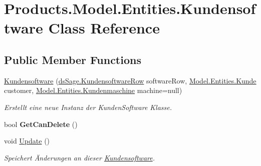 \hypertarget{class_products_1_1_model_1_1_entities_1_1_kundensoftware}{}\section{Products.\+Model.\+Entities.\+Kundensoftware Class Reference}
\label{class_products_1_1_model_1_1_entities_1_1_kundensoftware}
\subsection*{Public Member Functions}
\begin{DoxyCompactItemize}
\item 
\hyperlink{class_products_1_1_model_1_1_entities_1_1_kundensoftware_ab1a7f611574369c4fd3ec7b47744e530}{Kundensoftware} (\hyperlink{class_products_1_1_data_1_1ds_sage_1_1_kundensoftware_row}{ds\+Sage.\+Kundensoftware\+Row} software\+Row, \hyperlink{class_products_1_1_model_1_1_entities_1_1_kunde}{Model.\+Entities.\+Kunde} customer, \hyperlink{class_products_1_1_model_1_1_entities_1_1_kundenmaschine}{Model.\+Entities.\+Kundenmaschine} machine=null)
\begin{DoxyCompactList}\small\item\em Erstellt eine neue Instanz der Kunden\+Software Klasse. \end{DoxyCompactList}\item 
bool {\bfseries Get\+Can\+Delete} ()\hypertarget{class_products_1_1_model_1_1_entities_1_1_kundensoftware_a297dd386662d6cf12e5f022dbbd592f2}{}\label{class_products_1_1_model_1_1_entities_1_1_kundensoftware_a297dd386662d6cf12e5f022dbbd592f2}

\item 
void \hyperlink{class_products_1_1_model_1_1_entities_1_1_kundensoftware_ab07c7853138ca5b9cddcc2bf90ca6690}{Update} ()
\begin{DoxyCompactList}\small\item\em Speichert Änderungen an dieser \hyperlink{class_products_1_1_model_1_1_entities_1_1_kundensoftware}{Kundensoftware}. \end{DoxyCompactList}\end{DoxyCompactItemize}
